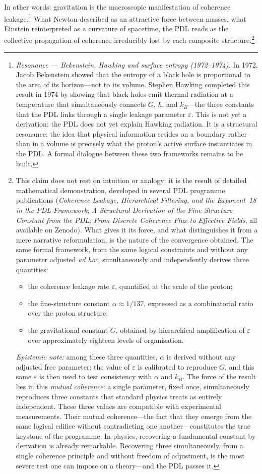 \documentclass[12pt, a4paper, openright]{book}
\begin{document}
In other words: gravitation is the macroscopic manifestation of coherence leakage.\footnote{\textit{Resonance --- Bekenstein, Hawking and surface entropy (1972--1974).} In 1972, Jacob Bekenstein showed that the entropy of a black hole is proportional to the area of its horizon---not to its volume. Stephen Hawking completed this result in 1974 by showing that black holes emit thermal radiation at a temperature that simultaneously connects $G$, $\hbar$, and $k_B$---the three constants that the PDL links through a single leakage parameter $\varepsilon$. This is not yet a derivation: the PDL does not yet explain Hawking radiation. It is a structural resonance: the idea that physical information resides on a boundary rather than in a volume is precisely what the proton's active surface instantiates in the PDL. A formal dialogue between these two frameworks remains to be built.} What Newton described as an attractive force between masses, what Einstein reinterpreted as a curvature of spacetime, the PDL reads as the collective propagation of coherence irreducibly lost by each composite structure.\footnote{This claim does not rest on intuition or analogy: it is the result of detailed mathematical demonstration, developed in several PDL programme publications (\textit{Coherence Leakage, Hierarchical Filtering, and the Exponent~18 in the PDL Framework}; \textit{A Structural Derivation of the Fine-Structure Constant from the PDL}; \textit{From Discrete Coherence Flux to Effective Fields}, all available on Zenodo). What gives it its force, and what distinguishes it from a mere narrative reformulation, is the nature of the convergence obtained. The same formal framework, from the same logical constraints and without any parameter adjusted \emph{ad hoc}, simultaneously and independently derives three quantities:
\begin{itemize}
\item the coherence leakage rate $\varepsilon$, quantified at the scale of the proton;
\item the fine-structure constant $\alpha \approx 1/137$, expressed as a combinatorial ratio over the proton structure;
\item the gravitational constant $G$, obtained by hierarchical amplification of $\varepsilon$ over approximately eighteen levels of organisation.
\end{itemize}
\textit{Epistemic note:} among these three quantities, $\alpha$ is derived without any adjusted free parameter; the value of $\varepsilon$ is calibrated to reproduce $G$, and this same $\varepsilon$ is then used to test consistency with $\alpha$ and $k_B$. The force of the result lies in this \emph{mutual coherence}: a single parameter, fixed once, simultaneously reproduces three constants that standard physics treats as entirely independent. These three values are compatible with experimental measurements. Their mutual coherence---the fact that they emerge from the same logical edifice without contradicting one another---constitutes the true keystone of the programme. In physics, recovering a fundamental constant by derivation is already remarkable. Recovering three simultaneously, from a single coherence principle and without freedom of adjustment, is the most severe test one can impose on a theory---and the PDL passes it.}
\end{document}
